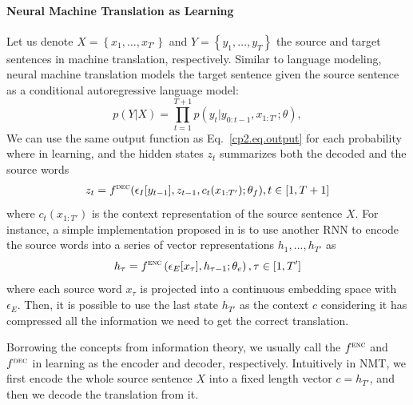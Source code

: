 \paragraph{Neural Machine Translation as \sts Learning} 
Let us denote $X=\left\{ x_1, \ldots, x_{T'} \right\}$ and $Y=\left\{ y_1, \ldots, y_T \right\}$ the source and target sentences in machine translation, respectively. Similar to language modeling, neural machine translation models the target sentence given the source sentence as a conditional autoregressive language model:
\begin{equation}
	\label{cp2.eq.auto_sts}
    p(Y|X) =  \prod_{t=1}^{T+1}p(y_t|y_{0:t-1}, x_{1:T'}; \theta),
\end{equation}
We can use the same output function as Eq.~\ref{cp2.eq.output} for each probability where in \sts learning, and the hidden states $z_t$ summarizes both the decoded and the source words
\begin{equation}
    \label{cp2.eq.hidden_state}
    \begin{split}
         z_t = f^{\textsc{dec}}(\epsilon_I[y_{t-1}], z_{t-1}, c_t(x_{1:T'}); {\theta}_f), t \in [1, T+1]
    \end{split}
\end{equation}
where $c_t(x_{1:T'})$ is the context representation of the source sentence $X$. For instance, a simple implementation proposed in  is to use another RNN to encode the source words into a series of vector representations $h_1, ..., h_{T'}$ as 
\begin{equation}
    \label{cp2.eq.rnn_encoder}
    h_\tau = f^{\textsc{enc}}\left(\epsilon_{E}[x_\tau], h_{\tau-1}; \theta_e\right),  \tau \in [1, T']
\end{equation}
where each source word $x_\tau$ is projected into a continuous embedding space with $\epsilon_{E}$. Then, it is possible to use the last state $h_{T'}$ as the context $c$ considering it has compressed all the information we need to get the correct translation.

Borrowing the concepts from information theory, we usually call the $ f^{\textsc{enc}}$ and $ f^{\textsc{dec}}$ in \sts learning as the encoder and decoder, respectively. Intuitively in NMT, we first encode the whole source sentence $X$ into a fixed length vector $c = h_{T'}$, and then we decode the translation from it.

